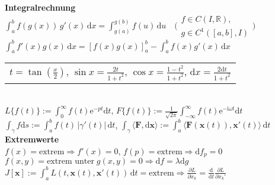 \documentclass[a4paper,10pt,fleqn,twoside,twocolumn,dvipdfmx]{scrartcl}
\newcommand{\ee}{\mathrm e}
\newcommand{\ui}{\mathrm i}
\newcommand{\R}{\mathbb R}
\newcommand{\strong}[1]{\textsf{\textbf{#1}}}
\newcommand{\ds}{\displaystyle}
\newcommand{\bvec}[1]{\mathbf{#1}}
\begin{document}
\strong{Integralrechnung}\\
$\int_a^b f(g(x))\,g'(x)\,\mathrm dx = \int_{g(a)}^{g(b)} f(u)\,\mathrm du\quad
\Big(\begin{smallmatrix}f\in C(I,\R),\\ g\in C^1([a,b],I)\end{smallmatrix}\Big)$\\
$\int_a^b\! f'(x)g(x)\,\mathrm dx = [f(x)g(x)]_a^b-\int_a^b\! f(x)g'(x)\,\mathrm dx$%
\;\\
\begin{tabular}{@{}l}
$t=\tan(\frac{x}{2})$,\; $\sin x = \frac{2t}{1+t^2}$,\;
$\cos x = \frac{1-t^2}{1+t^2}$,\; $\mathrm dx = \frac{2\mathrm dt}{1+t^2}$
\end{tabular}\\
$L\{f(t)\} := \int_0^{\infty}\! f(t)\ee^{-pt}\mathrm dt$,\;
$F\{f(t)\} := \frac{1}{\sqrt{2\pi}}\int_{-\infty}^{\infty}
f(t)\ee^{-\ui\omega t}\mathrm dt$\\
$\int_\gamma f\mathrm ds := \!\int_a^b\! f(t)\,|\gamma'(t)|\,\mathrm dt$,\;
$\int_\gamma\!\langle\bvec F,\mathrm d\bvec x\rangle
:= \!\int_a^b\! \langle\bvec F(\bvec x(t)),\bvec x'(t)\rangle\,\mathrm dt$\\[4pt]
\strong{Extremwerte}\\[2pt]
$f(x)=\text{extrem} \Rightarrow f'(x)=0$,\; $f(p)=\text{extrem} \Rightarrow \mathrm df_p=0$\\
$f(x,y)=\text{extrem unter}\;g(x,y)=0 \Rightarrow \mathrm df = \lambda\mathrm dg$\\
$\ds J[\bvec x] := {\textstyle\int_a^b} L(t,\bvec x(t),\bvec x'(t))\,\mathrm dt
= \text{extrem}
\Rightarrow\frac{\partial L}{\partial x_k}
= \frac{\mathrm d}{\mathrm dt}\frac{\partial L}{\partial x_k'}$
\end{document}
